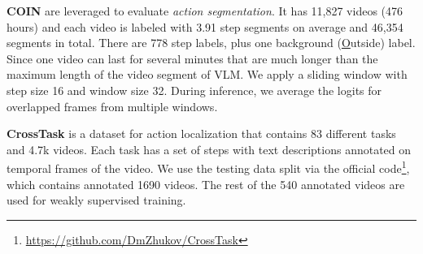 \documentclass[11pt,a4paper]{article}
\begin{document}
\noindent \textbf{COIN} \cite{tang2019coin} are leveraged to evaluate \textit{action segmentation}.
It has 11,827 videos (476 hours) and each video is labeled with 3.91 step segments on average and 46,354 segments in total. There are 778 step labels, plus one background (\underline{O}utside) label. Since one video can last for several minutes that are much longer than the maximum length of the video segment of VLM. We apply a sliding window with step size 16 and window size 32.
During inference, we average the logits for overlapped frames from multiple windows.

\noindent \textbf{CrossTask} \cite{zhukov2019cross} is a dataset for action localization that contains 83 different tasks and 4.7k videos. Each task has a set of steps with text descriptions annotated on temporal frames of the video.
We use the testing data split via the official code\footnote{ \url{https://github.com/DmZhukov/CrossTask}}, which contains annotated 1690 videos. The rest of the 540 annotated videos are used for weakly supervised training.

\begin{table*}[t]
    \centering
    \caption{Comparison of pre-trained models on learning paradigms (SSL means self-supervised learning; MTL means multi-task learning), number of parameters (\# params.), number of losses (\#loss), number of unimodal/cross-modal encoders/decoders, and whether to support retrieval in joint space(joint retrieval) and text generation. Types and numbers are estimated based on released code or papers: exceptions are in parenthesis (e.g. pair means pairwise matching using \texttt{[CLS]}). VLM is extremely simple with fewer parameters and limitations.}
    \label{tbl:num_param}
\end{table*}
\end{document}
